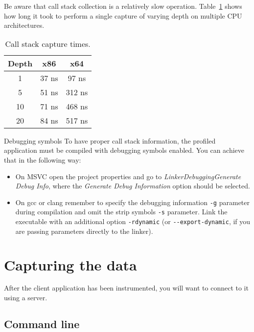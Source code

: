 \documentclass[hidelinks,titlepage,a4paper]{article}
\begin{document}
Be aware that call stack collection is a relatively slow operation. Table~\ref{CallstackTimes} shows how long it took to perform a single capture of varying depth on multiple CPU architectures.

\begin{table}[h]
\centering
\begin{tabular}[h]{c|c|c}
\textbf{Depth} & \textbf{x86} & \textbf{x64} \\ \hline
1 & 37 \si{\nano\second} & 97 \si{\nano\second} \\
5 & 51 \si{\nano\second} & 312 \si{\nano\second} \\
10 & 71 \si{\nano\second} & 468 \si{\nano\second} \\
20 & 84 \si{\nano\second} & 517 \si{\nano\second}
\end{tabular}
\caption{Call stack capture times.}
\label{CallstackTimes}
\end{table}

\begin{bclogo}[
noborder=true,
couleur=black!5,
logo=\bcattention
]{Debugging symbols}
To have proper call stack information, the profiled application must be compiled with debugging symbols enabled. You can achieve that in the following way:

\begin{itemize}
\item On MSVC open the project properties and go to \emph{Linker\textrightarrow Debugging\textrightarrow Generate Debug Info}, where the \emph{Generate Debug Information} option should be selected.
\item On gcc or clang remember to specify the debugging information \texttt{-g} parameter during compilation and omit the strip symbols \texttt{-s} parameter. Link the executable with an additional option \texttt{-rdynamic} (or \texttt{-{}-export-dynamic}, if you are passing parameters directly to the linker).
\end{itemize}
\end{bclogo}

\section{Capturing the data}
\label{capturing}

After the client application has been instrumented, you will want to connect to it using a server.

\subsection{Command line}
\end{document}
